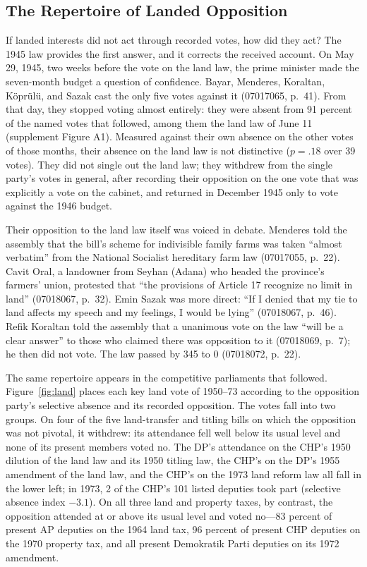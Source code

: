 \documentclass[12pt]{article}
\begin{document}
\subsection*{The Repertoire of Landed Opposition}

If landed interests did not act through recorded votes, how did they act? The 1945 law provides the first answer, and it corrects the received account. On May 29, 1945, two weeks before the vote on the land law, the prime minister made the seven-month budget a question of confidence. Bayar, Menderes, Koraltan, Köprülü, and Sazak cast the only five votes against it (07017065, p.~41). From that day, they stopped voting almost entirely: they were absent from 91 percent of the named votes that followed, among them the land law of June 11 (supplement Figure A1). Measured against their own absence on the other votes of those months, their absence on the land law is not distinctive ($p=.18$ over 39 votes). They did not single out the land law; they withdrew from the single party's votes in general, after recording their opposition on the one vote that was explicitly a vote on the cabinet, and returned in December 1945 only to vote against the 1946 budget.

Their opposition to the land law itself was voiced in debate. Menderes told the assembly that the bill's scheme for indivisible family farms was taken ``almost verbatim'' from the National Socialist hereditary farm law (07017055, p.~22). Cavit Oral, a landowner from Seyhan (Adana) who headed the province's farmers' union, protested that ``the provisions of Article 17 recognize no limit in land'' (07018067, p.~32). Emin Sazak was more direct: ``If I denied that my tie to land affects my speech and my feelings, I would be lying'' (07018067, p.~46). Refik Koraltan told the assembly that a unanimous vote on the law ``will be a clear answer'' to those who claimed there was opposition to it (07018069, p.~7); he then did not vote. The law passed by 345 to 0 (07018072, p.~22).

The same repertoire appears in the competitive parliaments that followed. Figure~\ref{fig:land} places each key land vote of 1950--73 according to the opposition party's selective absence and its recorded opposition. The votes fall into two groups. On four of the five land-transfer and titling bills on which the opposition was not pivotal, it withdrew: its attendance fell well below its usual level and none of its present members voted no. The DP's attendance on the CHP's 1950 dilution of the land law and its 1950 titling law, the CHP's on the DP's 1955 amendment of the land law, and the CHP's on the 1973 land reform law all fall in the lower left; in 1973, 2 of the CHP's 101 listed deputies took part (selective absence index $-3.1$). On all three land and property taxes, by contrast, the opposition attended at or above its usual level and voted no---83 percent of present AP deputies on the 1964 land tax, 96 percent of present CHP deputies on the 1970 property tax, and all present Demokratik Parti deputies on its 1972 amendment.
\end{document}
